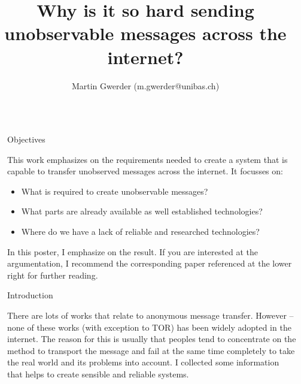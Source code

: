 \documentclass[10pt]{beamer}
\title{\LARGE Why is it so hard sending unobservable messages across the internet?} %
\author{Martin Gwerder (m.gwerder@unibas.ch)} %
\institute{Department of Mathematics and Computer Science, University of Basel} %
\newlength{\sepwid}
\newlength{\onecolwid}
\begin{document}
%
\begin{frame}[t] %

\begin{columns}[t] %

\begin{column}{\sepwid}\end{column} %

\begin{column}{\onecolwid} %


\begin{alertblock}{Objectives}

This work emphasizes on the requirements needed to create a system that is capable to transfer unobserved messages across the internet. It focusses on:
\begin{itemize}
\item What is required to create unobservable messages?
\item What parts are already available as well established technologies?
\item Where do we have a lack of reliable and researched technologies?
\end{itemize}

In this poster, I emphasize on the result. If you are interested at the argumentation, I recommend the corresponding paper referenced at the lower right for further reading.

\end{alertblock}

\vfill
\begin{block}{Introduction}

There are lots of works\cite{tor-design}\cite{mixmaster-spec}\cite{xor-trees}\cite{Levine:2002} that relate to anonymous message transfer. However -- none of these works (with exception to TOR\cite{tor-design}) has been widely adopted in the internet. The reason for this is usually that peoples tend to concentrate on the method to transport the message and fail at the same time completely to take the real world and its problems into account. I collected some information that helps to create sensible and reliable systems. 


\end{block}
\end{column}
\end{columns}
\end{frame}
\end{document}
